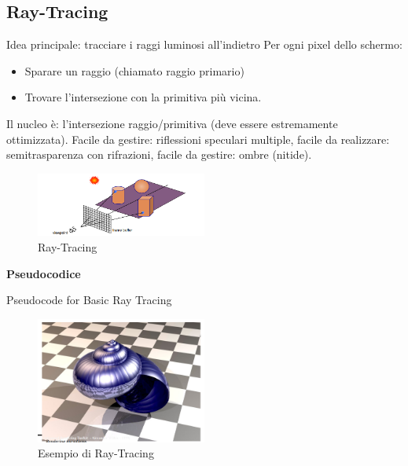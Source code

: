 \subsection{Ray-Tracing}
Idea principale: tracciare i raggi luminosi all'indietro
Per ogni pixel dello schermo:
  \begin{itemize}
    \item Sparare un raggio (chiamato raggio primario)
    \item Trovare l'intersezione con la primitiva più vicina.
  \end{itemize}
Il nucleo è: l'intersezione raggio/primitiva (deve essere estremamente ottimizzata).
Facile da gestire: riflessioni speculari multiple, facile da realizzare: semitrasparenza con rifrazioni, facile da gestire: ombre (nitide).
\begin{figure}[H]
    \centering
    \includegraphics[width=0.5\textwidth]{images/RayTraces.png} 
    \caption{Ray-Tracing}
    \label{fig:immagine}
\end{figure}
\textbf{Pseudocodice}
\begin{algorithm}[H]
    \SetAlgoLined
    \caption{Pseudocode for Basic Ray Tracing}
    \end{algorithm}
    \begin{figure}[H]
        \centering
        \includegraphics[width=0.5\textwidth]{images/ExRayTrace.png} 
        \caption{ Esempio di Ray-Tracing}
        \label{fig:immagine}
    \end{figure}
